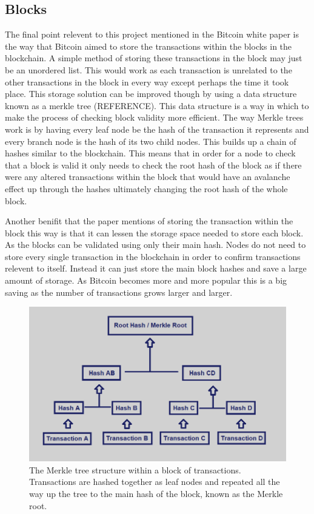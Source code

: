\documentclass{l4proj}
\begin{document}
\subsection{Blocks}
The final point relevent to this project mentioned in the Bitcoin white paper is the way that Bitcoin aimed to store
the transactions within the blocks in the blockchain. A simple method of storing these transactions in the block may
just be an unordered list. This would work as each transaction is unrelated to the other transactions in the block in
every way except perhaps the time it took place. This storage solution can be improved though by using a data structure
known as a merkle tree (REFERENCE). This data structure is a way in which to make the process of checking block validity
more efficient. The way Merkle trees work is by having every leaf node be the hash of the transaction it represents 
and every branch node is the hash of its two child nodes. This builds up a chain of hashes similar to the blockchain.
This means that in order for a node to check that a block is valid it only needs to check the root hash of the block as
if there were any altered transactions within the block that would have an avalanche effect up through the hashes
ultimately changing the root hash of the whole block.

Another benifit that the paper mentions of storing the transaction within the block this way is that it can lessen
the storage space needed to store each block. As the blocks can be validated using only their main hash. Nodes do 
not need to store every single transaction in the blockchain in order to confirm transactions relevent to itself.
Instead it can just store the main block hashes and save a large amount of storage. As Bitcoin becomes more and
more popular this is a big saving as the number of transactions grows larger and larger.

\begin{figure}
    \centering
    \includegraphics[width=0.7\linewidth]{images/merkle-tree.png}    

    \caption{
        The Merkle tree structure within a block of transactions. Transactions are hashed together as leaf nodes
        and repeated all the way up the tree to the main hash of the block, known as the Merkle root.
    }

    \label{fig:relu} 
\end{figure}
\end{document}
